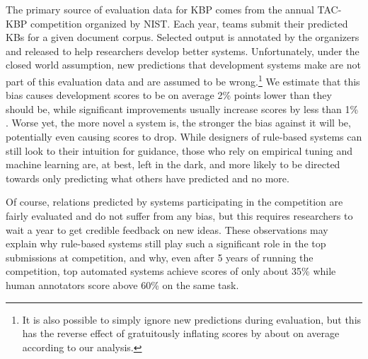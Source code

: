 The primary source of evaluation data for KBP comes from the annual TAC-KBP competition organized by NIST.\@ %
Each year, teams submit their predicted KBs for a given document corpus.
Selected output is annotated by the organizers and released to help researchers develop better systems.
Unfortunately, under the closed world assumption, new predictions that development systems make are not part of this evaluation data and are assumed to be wrong.\footnote{%
It is also possible to simply ignore new predictions during evaluation, but this has the reverse effect of gratuitously inflating scores by about  on average according to our analysis.}
We estimate that this bias causes development \fone{} scores to be on average 2\% points lower than they should be, while significant improvements usually increase scores by less than 1\% \fone{}.
Worse yet, the more novel a system is, the stronger the bias against it will be, potentially even causing scores to drop.
While designers of rule-based systems can still look to their intuition for guidance, those who rely on empirical tuning and machine learning are, at best, left in the dark, and more likely to be directed towards only predicting what others have predicted and no more.

Of course, relations predicted by systems participating in the competition are fairly evaluated and do not suffer from any bias, but this requires researchers to wait a year to get credible feedback on new ideas.
%
These observations may explain why rule-based systems still play such a significant role in the top submissions at competition, and why, even after 5 years of running the competition, top automated systems achieve scores of only about 35\%\fone{} while human annotators score above 60\%\fone{} on the same task.


